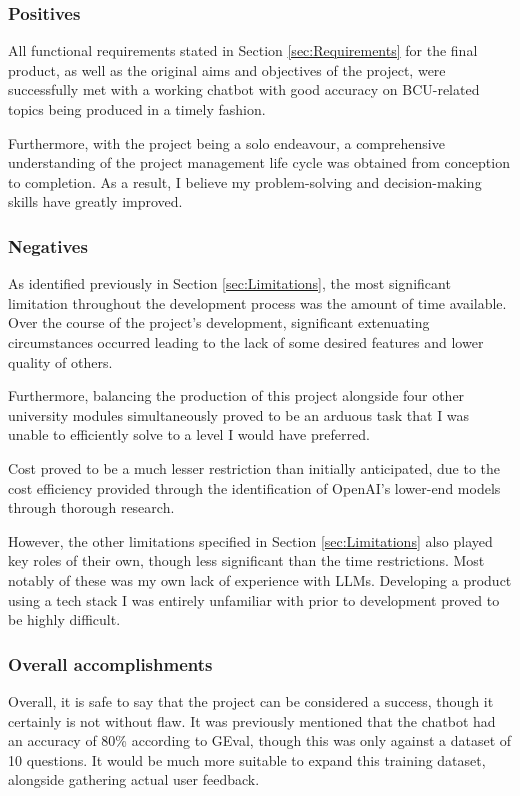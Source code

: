 \subsubsection{Positives}
All functional requirements stated in Section \ref{sec:Requirements} for the final product, as well as the original aims and objectives 
of the project, were successfully met with a working chatbot with good accuracy on BCU-related topics being produced in a timely fashion.

\para Furthermore, with the project being a solo endeavour, a comprehensive understanding of the project management life cycle was 
obtained from conception to completion. As a result, I believe my problem-solving and decision-making skills have greatly improved.   

\subsubsection{Negatives}
As identified previously in Section \ref{sec:Limitations}, the most significant limitation throughout the development process 
was the amount of time available. Over the course of the project's development, significant extenuating circumstances occurred 
leading to the lack of some desired features and lower quality of others. 

\para Furthermore, balancing the production of this project 
alongside four other university modules simultaneously proved to be an arduous task that I was unable to efficiently solve to 
a level I would have preferred.

\para Cost proved to be a much lesser restriction than initially anticipated, due to the cost efficiency 
provided through the identification of OpenAI's lower-end models through thorough research. 

\para However, the other limitations specified in Section \ref{sec:Limitations} also played key roles of their own, though less significant 
than the time restrictions. Most notably of these was my own lack of experience with LLMs. Developing a product using a tech stack 
I was entirely unfamiliar with prior to development proved to be highly difficult.

\subsubsection{Overall accomplishments}
Overall, it is safe to say that the project can be considered a success, though it certainly is not without flaw.
It was previously mentioned that the chatbot had an accuracy of 80\% according to GEval, though this was only against a dataset 
of 10 questions. It would be much more suitable to expand this training dataset, alongside gathering actual user feedback.

